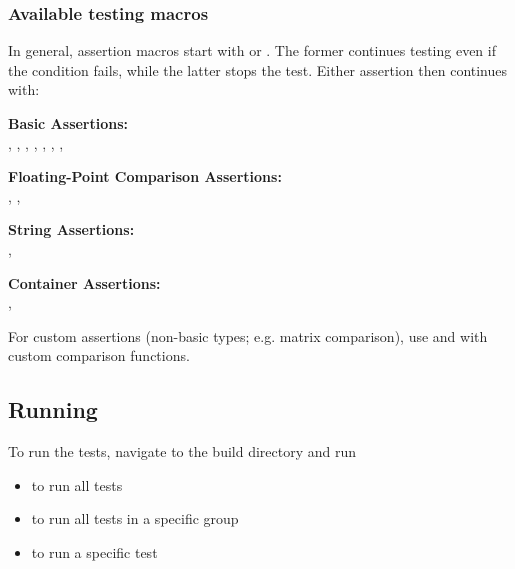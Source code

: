 \subsubsection{Available testing macros}
In general, assertion macros start with  or . The former continues testing even if the condition fails, while the latter stops the test. Either assertion then continues with:

\noindent\makebox[\linewidth]{\rule{\columnwidth}{1pt}}
\textbf{Basic Assertions:} \vspace{0.1cm} \\
, , , , , , , 

\noindent\makebox[\linewidth]{\rule{\columnwidth}{1pt}}
\textbf{Floating-Point Comparison Assertions:} \vspace{0.1cm} \\
, , 

\noindent\makebox[\linewidth]{\rule{\columnwidth}{1pt}}
\textbf{String Assertions:} \vspace{0.1cm} \\
, 

\noindent\makebox[\linewidth]{\rule{\columnwidth}{1pt}}
\textbf{Container Assertions:} \vspace{0.1cm} \\
, \\

\noindent\makebox[\linewidth]{\rule{\columnwidth}{1pt}}
For custom assertions (non-basic types; e.g. matrix comparison), use  and  with custom comparison functions.



\subsection{Running}
To run the tests, navigate to the build directory and run
\begin{itemize}
    \item {} to run all tests
    \item {} to run all tests in a specific group
    \item {} to run a specific test
\end{itemize}